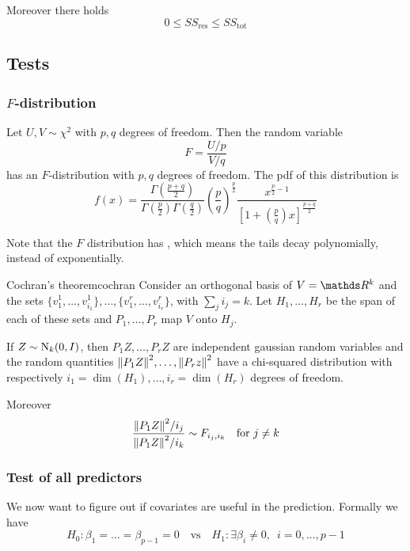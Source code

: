 \documentclass[12pt]{extarticle}
\newcommand{\Normal}{{\operatorfont N}}
\begin{document}
Moreover there holds
\begin{equation}
    0 \leq SS_\text{res} \leq SS_\text{tot}
\end{equation}

\subsection{Tests}

\subsubsection{\texorpdfstring{$F$}{F}-distribution}
Let $U, V \sim \chi^2$ with $p, q$ degrees of freedom.
Then the random variable
\begin{equation}
    F = \frac{U/p}{V/q}
\end{equation}
has an $F$-distribution with $p,q$ degrees of freedom.
The pdf of this distribution is
\begin{equation}
    f(x) =
    \frac{\Gamma\left( \frac{p+q}{2} \right)}{\Gamma\left(\frac{p}{2}\right) \Gamma\left(\frac{q}{2}\right)}
    \left( \frac{p}{q} \right)^{\frac{p}{2}}
    \frac{x^{\frac{p}{2}-1}}{\left[1+\left( \frac{p}{q} \right) x \right]^{\frac{p+q}{2}}}
\end{equation}

Note that the $F$ distribution has , which means the tails decay polynomially, instead of exponentially.

\begin{theorem}{Cochran's theorem}{cochran}
    Consider an orthogonal basis of $V = \R^k$ and the sets $\{v_1^1, \dots, v_{i_1}^1\},\dots,\{v_1^r, \dots, v_{i_r}^r\}$,
    with $\sum_j i_j = k$.
    Let $H_1, \dots, H_r$ be the span of each of these sets
    and $P_1, \dots, P_r$ map $V$ onto $H_j$.

    If $Z \sim \Normal_k(0, I)$, then $P_1 Z, \dots, P_r Z$ are independent gaussian random variables
    and the random quantities $\norm{P_1 Z}^2, \dots, \norm{P_r z}^2$ have a chi-squared distribution
    with respectively $i_1 = \dim(H_1), \dots, i_r = \dim(H_r)$ degrees of freedom.

    Moreover
    \begin{equation}
        \frac{\norm{P_1 Z}^2/i_j}{\norm{P_1 Z}^2/i_k} \sim F_{i_j, i_k} \quad \text{for } j \neq k
    \end{equation}
\end{theorem}

\subsubsection{Test of all predictors}
We now want to figure out if covariates are useful in the prediction.
Formally we have
\begin{equation}
    H_0: \beta_1 = \dots = \beta_{p-1} = 0 \quad \text{vs} \quad H_1: \exists \beta_i \neq 0, \enspace i = 0, \dots, p-1
\end{equation}
\end{document}
